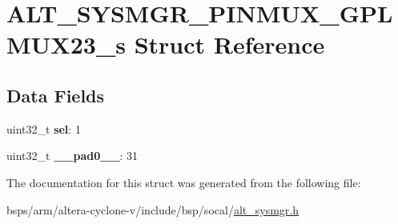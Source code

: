 \hypertarget{structALT__SYSMGR__PINMUX__GPLMUX23__s}{}\section{A\+L\+T\+\_\+\+S\+Y\+S\+M\+G\+R\+\_\+\+P\+I\+N\+M\+U\+X\+\_\+\+G\+P\+L\+M\+U\+X23\+\_\+s Struct Reference}
\label{structALT__SYSMGR__PINMUX__GPLMUX23__s}
\subsection*{Data Fields}
\begin{DoxyCompactItemize}
\item 
\mbox{\label{structALT__SYSMGR__PINMUX__GPLMUX23__s_a00d10de734067947f42eb8fdcc792284}} 
uint32\+\_\+t {\bfseries sel}\+: 1
\item 
\mbox{\label{structALT__SYSMGR__PINMUX__GPLMUX23__s_a306a3ec050638dc876dfb7cd1cad2922}} 
uint32\+\_\+t {\bfseries \+\_\+\+\_\+pad0\+\_\+\+\_\+}\+: 31
\end{DoxyCompactItemize}


The documentation for this struct was generated from the following file\+:\begin{DoxyCompactItemize}
\item 
bsps/arm/altera-\/cyclone-\/v/include/bsp/socal/\mbox{\hyperlink{alt__sysmgr_8h}{alt\+\_\+sysmgr.\+h}}\end{DoxyCompactItemize}
